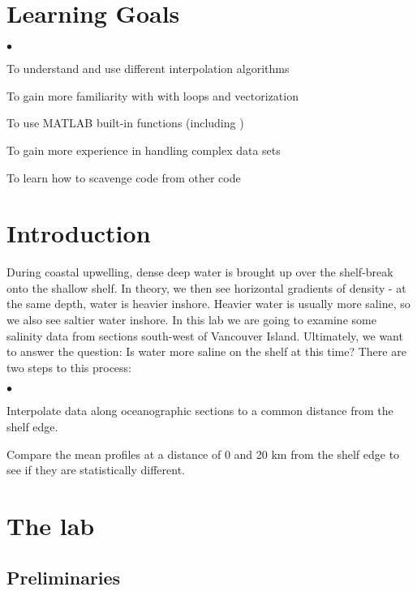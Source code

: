 \documentclass[letterpaper]{article}
\newcounter{lnum}
\newenvironment{abbrevlist}%
  {\begin{list}{$\bullet$}{\setlength{\leftmargin}{2em}%
               \setlength{\itemindent}{0em}%
               \setlength{\itemsep}{0pt}%
               \setlength{\parsep}{0pt}%
               \setlength{\topsep}{2pt}%
               \usecounter{lnum} } }{\end{list}}
\begin{document}
\section {Learning Goals}
	\begin {abbrevlist}
		\item To understand and use different interpolation algorithms 
		\item To gain more familiarity with with loops and vectorization
		\item To use MATLAB built-in functions  (including )
		\item To gain more experience in handling complex data sets
		\item To learn how to scavenge code from other code
	\end {abbrevlist}

\section{Introduction}

During coastal upwelling, dense deep water is brought up over the shelf-break onto
the shallow shelf. In theory, we then see horizontal gradients of density - at the same
depth, water is heavier inshore. Heavier water is usually more saline, so we also see 
saltier water inshore. In this lab we are going to examine some salinity data from sections south-west of Vancouver
Island. Ultimately, we want to answer the question: Is water more saline on the shelf at this time?
There are two steps to this process:
\begin{abbrevlist}
\item Interpolate data along oceanographic sections to a common distance from the shelf edge.
\item Compare the mean profiles at a distance of 0 and 20 km from the shelf edge to see
if they are statistically different.
\end{abbrevlist}

\section {The lab}

\subsection{Preliminaries}
\end{document}
